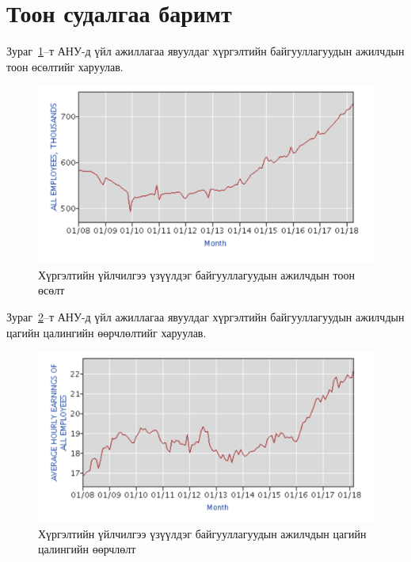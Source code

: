 \section{Тоон судалгаа баримт}

Зураг~\ref{fig:employee}--т АНУ-д үйл ажиллагаа явуулдаг хүргэлтийн байгууллагуудын ажилчдын тоон өсөлтийг харуулав.
\begin{figure}[H]
	\includegraphics[width=\textwidth]{Figures/sudalgaa/employees.png}
	\caption{Хүргэлтийн үйлчилгээ үзүүлдэг байгууллагуудын ажилчдын тоон өсөлт}
	\label{fig:employee}
\end{figure}
Зураг~\ref{fig:earnings}--т АНУ-д үйл ажиллагаа явуулдаг хүргэлтийн байгууллагуудын ажилчдын цагийн цалингийн өөрчлөлтийг харуулав.
\begin{figure}[H]
	\includegraphics[width=\textwidth]{Figures/sudalgaa/earnings.png}
	\caption{Хүргэлтийн үйлчилгээ үзүүлдэг байгууллагуудын ажилчдын цагийн цалингийн өөрчлөлт\cite{Statics}}
	\label{fig:earnings}
\end{figure}

